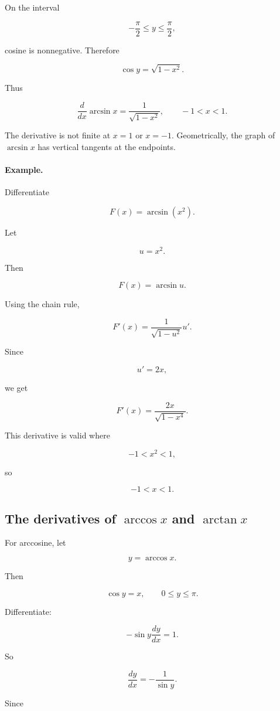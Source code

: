 On the interval

\[
-\frac{\pi}{2}\le y\le \frac{\pi}{2},
\]

cosine is nonnegative.  Therefore

\[
\cos y=\sqrt{1-x^2}.
\]

Thus

\[
\boxed{
\frac{d}{dx}\arcsin x=\frac1{\sqrt{1-x^2}},
\qquad -1<x<1.
}
\]

The derivative is not finite at \(x=1\) or \(x=-1\).  Geometrically, the graph of \(\arcsin x\) has vertical tangents at the endpoints.

\paragraph{Example.}
Differentiate

\[
F(x)=\arcsin(x^2).
\]

Let

\[
u=x^2.
\]

Then

\[
F(x)=\arcsin u.
\]

Using the chain rule,

\[
F'(x)=\frac{1}{\sqrt{1-u^2}}u'.
\]

Since

\[
u'=2x,
\]

we get

\[
\boxed{
F'(x)=\frac{2x}{\sqrt{1-x^4}}.
}
\]

This derivative is valid where

\[
-1<x^2<1,
\]

so

\[
-1<x<1.
\]

\subsection{The derivatives of \texorpdfstring{\(\arccos x\)}{arccos x} and \texorpdfstring{\(\arctan x\)}{arctan x}}
\label{subsec:derivatives-arccos-arctan}

For arccosine, let

\[
y=\arccos x.
\]

Then

\[
\cos y=x,
\qquad
0\le y\le \pi.
\]

Differentiate:

\[
-\sin y\frac{dy}{dx}=1.
\]

So

\[
\frac{dy}{dx}=-\frac1{\sin y}.
\]

Since

